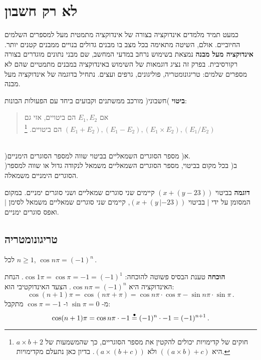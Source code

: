 
\chapter{%
לא רק חשבון%
}\label{s.notjust}

כמעט תמיד מלמדים אינדוקציה בצורה של אינדוקציה מתמטית מעל למספרים השלמים החיוביים. אולם, השיטה מתאימה בכל מצב בו מבנים גדולים בנויים ממבנים קטנים יותר.
\textbf{אינדוקציה מעל מבנה}
נמצאת בשימוש נרחב במדעי המחשב, שם מבני נתונים מוגדרים בצורה רקורסיבית. בפרק זה נציג דוגמאות של השימוש באינדוקציה במבנים מתמטיים שהם לא מספרים שלמים: טריגונומטריה, פוליגונים, גרפים ועצים. נתחיל בדוגמה של אינדוקציה מעל מבנה.

\begin{definition}
\textbf{ביטוי}
)חשבוני( מורכב ממשתנים וקבועים ביחד עם הפעולות הבונות:
\begin{quote}
אם
$E_1, E_2$
הם ביטויים, אזי גם
$(E_1+E_2), (E_1-E_2), (E_1\times E_2), (E_1/E_2)$
הם ביטויים.%
\footnote{%
חוקים של קדימויות יכולים להקטין את מספר הסוגריים, כך שהמשמעות של
$a\times b + 2$
היא
$((a\times b)+c)$
ולא
$(a\times (b+c))$.
בדיון כאן נתעלם מקדימויות.}
\end{quote}
\end{definition}

\begin{exercise}\mbox{}\\
)א( מספר הסוגרים השמאליים בביטוי שווה למספר הסוגרים הימניים.\\
)ב( בכל מקום בביטוי, מספר הסוגרים השמאליים משמאל לנקודה גדול או שווה למספר הסוגרים הימניים משמאלה.
\end{exercise}

\textbf{דוגמה}
בביטוי
$(x+(y-23))$
קיימים שני סוגרים שמאליים ושני סוגרים ימניים. במקום המסומן על ידי
$|$
בביטוי
$(x+(y\,|-23))$,
קיימים שני סוגרים שמאליים משמאל לסימן
$|$
ואפס סוגרים ימניים.

\section{%
טריגונומטריה%
}

\begin{theorem}\label{t.cos}
לכל
$n\geq 1$, $\cos n\pi = (-1)^n$\,.
\end{theorem}

\textbf{הוכחה}
טענת הבסיס פשוטה להוכחה:
$\cos 1\pi = \cos \pi = -1 = (-1)^1$.
הנחת האינדוקציה היא
$\cos n\pi = (-1)^n$.
הצעד האינדוקטיבי הוא:
\[
\cos (n+1)\pi = \cos (n\pi + \pi) = \cos n\pi \cdot \cos \pi - \sin n\pi \cdot \sin \pi\,.
\]
מ-%
$\sin \pi = 0$
ו-%
$\cos \pi = -1$
מתקבל:
\[
\cos (n+1)\pi = \cos n\pi \cdot -1 \stackrel{\bullet}{=}{} (-1)^n \cdot -1 = (-1)^{n+1}\,.
\]

